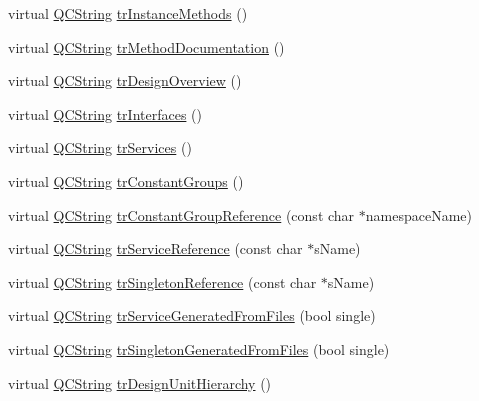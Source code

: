 \begin{DoxyCompactItemize}
\item 
virtual \mbox{\hyperlink{class_q_c_string}{Q\+C\+String}} \mbox{\hyperlink{class_translator_portuguese_aa4f928e964e1f5df0b7740c6dd28b186}{tr\+Instance\+Methods}} ()
\item 
virtual \mbox{\hyperlink{class_q_c_string}{Q\+C\+String}} \mbox{\hyperlink{class_translator_portuguese_a4c0b66791650c86f54b89f04a8d447a4}{tr\+Method\+Documentation}} ()
\item 
virtual \mbox{\hyperlink{class_q_c_string}{Q\+C\+String}} \mbox{\hyperlink{class_translator_portuguese_a5c1776892ce021d7216fdb7c332ea48c}{tr\+Design\+Overview}} ()
\item 
virtual \mbox{\hyperlink{class_q_c_string}{Q\+C\+String}} \mbox{\hyperlink{class_translator_portuguese_a71e2e46b7690a03aece2e2593dd7554f}{tr\+Interfaces}} ()
\item 
virtual \mbox{\hyperlink{class_q_c_string}{Q\+C\+String}} \mbox{\hyperlink{class_translator_portuguese_a457b124b00a17ae8094424c5f7e27cdb}{tr\+Services}} ()
\item 
virtual \mbox{\hyperlink{class_q_c_string}{Q\+C\+String}} \mbox{\hyperlink{class_translator_portuguese_a84eb21294f08b7c410a6dcaa6c808582}{tr\+Constant\+Groups}} ()
\item 
virtual \mbox{\hyperlink{class_q_c_string}{Q\+C\+String}} \mbox{\hyperlink{class_translator_portuguese_a874a040dbc8bd0185a93e1f075938a88}{tr\+Constant\+Group\+Reference}} (const char $\ast$namespace\+Name)
\item 
virtual \mbox{\hyperlink{class_q_c_string}{Q\+C\+String}} \mbox{\hyperlink{class_translator_portuguese_ab07d91b579c2db697fd45492ad756d56}{tr\+Service\+Reference}} (const char $\ast$s\+Name)
\item 
virtual \mbox{\hyperlink{class_q_c_string}{Q\+C\+String}} \mbox{\hyperlink{class_translator_portuguese_ae4700e1d3f715c3475489ccaca4c673a}{tr\+Singleton\+Reference}} (const char $\ast$s\+Name)
\item 
virtual \mbox{\hyperlink{class_q_c_string}{Q\+C\+String}} \mbox{\hyperlink{class_translator_portuguese_a1ebad291afbe1856923b27fe2c7193d4}{tr\+Service\+Generated\+From\+Files}} (bool single)
\item 
virtual \mbox{\hyperlink{class_q_c_string}{Q\+C\+String}} \mbox{\hyperlink{class_translator_portuguese_abefe9add4f8e278d4ca42cf17d728ef8}{tr\+Singleton\+Generated\+From\+Files}} (bool single)
\item 
virtual \mbox{\hyperlink{class_q_c_string}{Q\+C\+String}} \mbox{\hyperlink{class_translator_portuguese_a83d761d6b31e146638793086c045a92e}{tr\+Design\+Unit\+Hierarchy}} ()

\end{DoxyCompactItemize}
